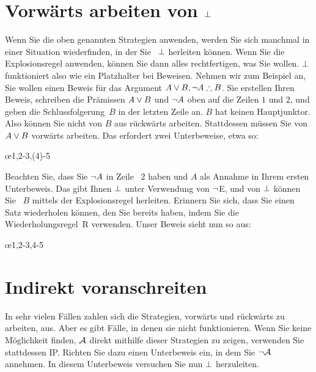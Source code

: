 \section{Vorwärts arbeiten von $\bot$}\label{sec:backred}

Wenn Sie die oben genannten Strategien anwenden, werden Sie sich manchmal in einer Situation wiederfinden, in der Sie ~$\bot$ herleiten können. Wenn Sie die Explosionsregel anwenden, können Sie dann alles rechtfertigen, was Sie wollen. $\bot$ funktioniert also wie ein Platzhalter bei Beweisen. Nehmen wir zum Beispiel an, Sie wollen einen Beweis für das Argument $A \eor B, \enot A \therefore B$. Sie erstellen Ihren Beweis, schreiben die Prämissen $A \vee B$ und $\neg A$ oben auf die Zeilen $1$ und $2$, und geben die Schlussfolgerung~$B$ in der letzten Zeile an. $B$ hat keinen Hauptjunktor. Also können Sie nicht von $B$ aus rückwärts arbeiten. Stattdessen müssen Sie von $A \vee B$ vorwärts arbeiten. Das erfordert zwei Unterbeweise, etwa so:
\begin{fitchproof}
	\open
	\ellipsesline 
	\close 
	\open
	\ellipsesline
	\close
	\oe{1,2-3,(4)-5} 
\end{fitchproof} 
Beachten Sie, dass Sie $\neg A$ in Zeile ~$2$ haben und $A$ als Annahme in Ihrem ersten Unterbeweis. Das gibt Ihnen $\bot$ unter Verwendung von $\neg$E, und von $\bot$ können Sie ~$B$ mittels der Explosionsregel herleiten. Erinnern Sie sich, dass Sie einen Satz wiederholen können, den Sie bereits haben, indem Sie die Wiederholungsregel~R verwenden. Unser Beweis sieht nun so aus:
\begin{fitchproof}
	\open
	\close 
	\open
	\close
	\oe{1,2-3,4-5} 
\end{fitchproof} 

\section{Indirekt voranschreiten}

In sehr vielen Fällen zahlen sich die Strategien, vorwärts und rückwärts zu arbeiten, aus. Aber es gibt Fälle, in denen sie nicht funktionieren. Wenn Sie keine Möglichkeit finden, $\mathcal{A}$ direkt mithilfe dieser Strategien zu zeigen, verwenden Sie stattdessen IP. Richten Sie dazu einen Unterbeweis ein, in dem Sie $\neg\mathcal{A}$ annehmen. In diesem Unterbeweis versuchen Sie nun $\bot$ herzuleiten.

